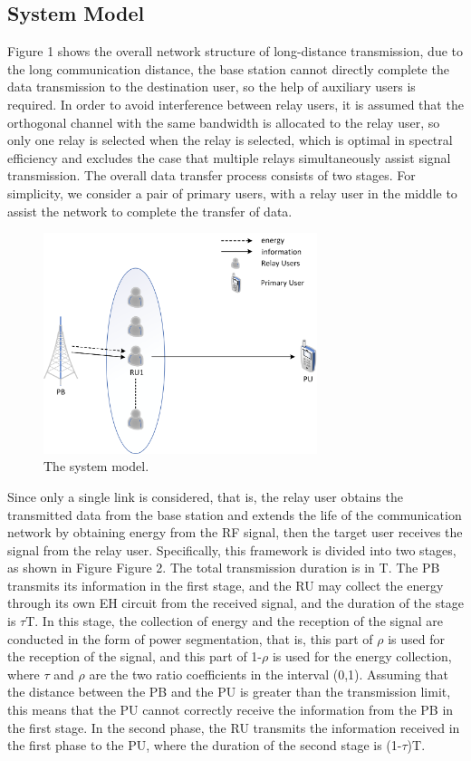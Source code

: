 \documentclass[conference]{IEEEtran}
\begin{document}
\subsection{System Model}\label{AA}

Figure 1 shows the overall network structure of long-distance transmission, due to the long communication distance, the base station cannot directly complete the data transmission to the destination user, so the help of auxiliary users is required. In order to avoid interference between relay users, it is assumed that the orthogonal channel with the same bandwidth is allocated to the relay user, so only one relay is selected when the relay is selected, which is optimal in spectral efficiency and excludes the case that multiple relays simultaneously assist signal transmission. The overall data transfer process consists of two stages. For simplicity, we consider a pair of primary users, with a relay user in the middle to assist the network to complete the transfer of data.

\begin{figure}[htbp]
\centerline{\includegraphics[width=8cm,keepaspectratio]{1.png}}
\caption{The system model.}
\label{fig}
\end{figure}

Since only a single link is considered, that is, the relay user obtains the transmitted data from the base station and extends the life of the communication network by obtaining energy from the RF signal, then the target user receives the signal from the relay user. Specifically, this framework is divided into two stages, as shown in Figure Figure 2. The total transmission duration is in T. The PB transmits its information in the first stage, and the RU may collect the energy through its own EH circuit from the received signal, and the duration of the stage is $\tau$T. In this stage, the collection of energy and the reception of the signal are conducted in the form of power segmentation, that is, this part of $\rho$ is used for the reception of the signal, and this part of 1-$\rho$ is used for the energy collection, where $\tau$ and $\rho$ are the two ratio coefficients in the interval (0,1). Assuming that the distance between the PB and the PU is greater than the transmission limit, this means that the PU cannot correctly receive the information from the PB in the first stage. In the second phase, the RU transmits the information received in the first phase to the PU, where the duration of the second stage is (1-$\tau$)T.
\end{document}
